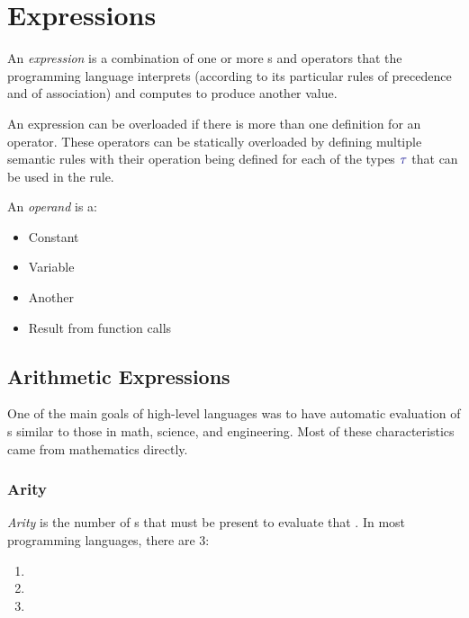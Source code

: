 \section{Expressions}\label{sec:Expressions}
\begin{definition}[Expression]\label{def:Expression}
  An \emph{expression} is a combination of one or more s and operators that the programming language interprets (according to its particular rules of precedence and of association) and computes to produce another value.

  \begin{remark}[Overloading]\label{rmk:Overloading_Expressions}
    An expression can be overloaded if there is more than one definition for an operator.
    These operators can be statically overloaded by defining multiple semantic rules with their operation being defined for each of the types $\DataType$ that can be used in the rule.
  \end{remark}
\end{definition}

\begin{definition}[Operand]\label{def:Operand}
  An \emph{operand} is a:
  \begin{itemize}[noitemsep]
  \item Constant
  \item Variable
  \item Another 
  \item Result from function calls
  \end{itemize}
\end{definition}

\subsection{Arithmetic Expressions}\label{subsec:Arithmetic_Expressions}
One of the main goals of high-level languages was to have automatic evaluation of s similar to those in math, science, and engineering.
Most of these characteristics came from mathematics directly.

\subsubsection{Arity}\label{subsubsec:Operator_Arity} %
\begin{definition}[Arity]\label{def:Arity}
  \emph{Arity} is the number of s that must be present to evaluate that .
  In most programming languages, there are 3:
  \begin{enumerate}[noitemsep]
  \item {}
  \item {}
  \item {}
  \end{enumerate}
\end{definition}


